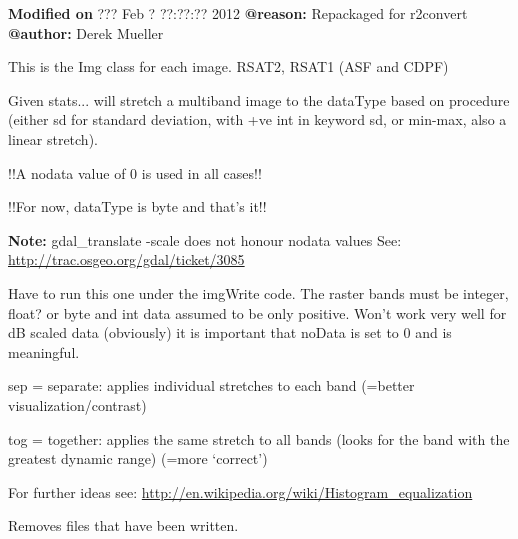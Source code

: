 \documentclass[letterpaper,10pt,english]{sphinxmanual}
\begin{document}
\textbf{Modified on} ??? Feb  ? ??:??:?? 2012 \textbf{@reason:} Repackaged for r2convert \textbf{@author:} Derek Mueller

\begin{fulllineitems}
\label{code:Image.Image}
This is the Img class for each image.  RSAT2, RSAT1 (ASF and CDPF)

\begin{fulllineitems}
\label{code:Image.Image.applyStretch}
Given stats... will stretch a multiband image to the dataType based on
procedure (either sd for standard deviation, with +ve int in keyword sd,
or min-max, also a linear stretch).

!!A nodata value of 0 is used in all cases!!

!!For now, dataType is byte and that's it!!

\textbf{Note:} gdal\_translate -scale does not honour nodata values
See: \href{http://trac.osgeo.org/gdal/ticket/3085}{http://trac.osgeo.org/gdal/ticket/3085}

Have to run this one under the imgWrite code. The raster bands must be integer, float? or byte
and int data assumed to be only positive. Won't work very well for dB scaled data (obviously)
it is important that noData is set to 0 and is meaningful.

sep = separate: applies individual stretches to each band (=better visualization/contrast)

tog = together: applies the same stretch to all bands (looks for the band with the greatest dynamic range) (=more `correct')

For further ideas see: \href{http://en.wikipedia.org/wiki/Histogram\_equalization}{http://en.wikipedia.org/wiki/Histogram\_equalization}

\end{fulllineitems}


\begin{fulllineitems}
\label{code:Image.Image.cleanFiles}
Removes files that have been written.


\end{fulllineitems}
\end{fulllineitems}
\end{document}
